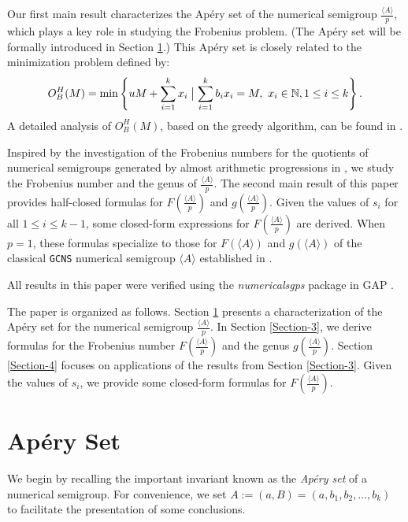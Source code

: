 \documentclass[reqno, 12pt]{article}
\theoremstyle{mydefinition}
\theoremstyle{myremark}
\numberwithin{algorithm}{section}
\begin{document}
Our first main result characterizes the Ap\'ery set of the numerical semigroup \(\frac{\langle A\rangle}{p}\), which plays a key role in studying the Frobenius problem. (The Ap\'ery set will be formally introduced in Section \ref{Section-2}.)
This Ap\'ery set is closely related to the minimization problem defined by:
\begin{align*}
O_{B}^{H}(M)=\min\left\{uM+\sum_{i=1}^kx_i \bigm| \sum_{i=1}^k b_ix_i=M, \ x_i\in\mathbb{N}, 1\leq i\leq k\right\}.
\end{align*}
A detailed analysis of $O_B^H(M)$, based on the greedy algorithm, can be found in \cite{LiuSemigroupF}.

Inspired by the investigation of the Frobenius numbers for the quotients of numerical semigroups generated by almost arithmetic progressions in \cite{A.Adeniran,Liu-IJAC}, we study the Frobenius number and the genus of $\frac{\langle A \rangle}{p}$.
The second main result of this paper provides half-closed formulas for $F\left( \frac{\langle A \rangle}{p} \right)$ and $g\left( \frac{\langle A \rangle}{p} \right)$.
Given the values of $s_i$ for all $1 \leq i \leq k-1$, some closed-form expressions for $ F\left( \frac{\langle A \rangle}{p} \right)$ are derived.
When $p=1$, these formulas specialize to those for $F(\langle A \rangle)$ and $g(\langle A \rangle)$ of the classical \texttt{GCNS} numerical semigroup $\langle A \rangle$ established in \cite{LiuSemigroupF}.

All results in this paper were verified using the \emph{numericalsgps} package in GAP \cite{M.Delgado}.

The paper is organized as follows.
Section \ref{Section-2} presents a characterization of the Ap\'ery set for the numerical semigroup $\frac{\langle A\rangle}{p}$. 
In Section \ref{Section-3}, we derive formulas for the Frobenius number $F\left( \frac{\langle A \rangle}{p} \right)$ and the genus $g\left( \frac{\langle A \rangle}{p} \right)$.
Section \ref{Section-4} focuses on applications of the results from Section \ref{Section-3}. Given the values of $s_i$, we provide some closed-form formulas for $ F\left( \frac{\langle A \rangle}{p} \right)$.


\section{Ap\'ery Set}\label{Section-2}

We begin by recalling the important invariant known as the \emph{Ap\'ery set} of a numerical semigroup.
For convenience, we set $A := (a, B) = (a, b_1, b_2, \ldots, b_k)$ to facilitate the presentation of some conclusions.
\end{document}
